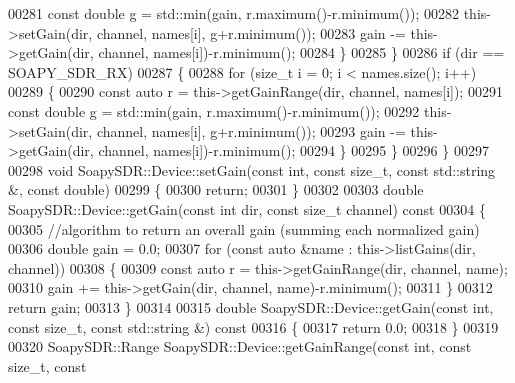 \begin{DoxyCode}
00281             \textcolor{keyword}{const} \textcolor{keywordtype}{double} g = std::min(gain, r.maximum()-r.minimum());
00282             this->setGain(dir, channel, names[i], g+r.minimum());
00283             gain -= this->getGain(dir, channel, names[i])-r.minimum();
00284         \}
00285     \}
00286     \textcolor{keywordflow}{if} (dir == SOAPY_SDR_RX)
00287     \{
00288         \textcolor{keywordflow}{for} (\textcolor{keywordtype}{size\_t} i = 0; i < names.size(); i++)
00289         \{
00290             \textcolor{keyword}{const} \textcolor{keyword}{auto} r = this->getGainRange(dir, channel, names[i]);
00291             \textcolor{keyword}{const} \textcolor{keywordtype}{double} g = std::min(gain, r.maximum()-r.minimum());
00292             this->setGain(dir, channel, names[i], g+r.minimum());
00293             gain -= this->getGain(dir, channel, names[i])-r.minimum();
00294         \}
00295     \}
00296 \}
00297 
00298 \textcolor{keywordtype}{void} SoapySDR::Device::setGain(\textcolor{keyword}{const} \textcolor{keywordtype}{int}, \textcolor{keyword}{const} \textcolor{keywordtype}{size\_t}, \textcolor{keyword}{const} std::string &, \textcolor{keyword}{const} \textcolor{keywordtype}{double})
00299 \{
00300     \textcolor{keywordflow}{return};
00301 \}
00302 
00303 \textcolor{keywordtype}{double} SoapySDR::Device::getGain(\textcolor{keyword}{const} \textcolor{keywordtype}{int} dir, \textcolor{keyword}{const} \textcolor{keywordtype}{size\_t} channel)\textcolor{keyword}{ const}
00304 \textcolor{keyword}{}\{
00305     \textcolor{comment}{//algorithm to return an overall gain (summing each normalized gain)}
00306     \textcolor{keywordtype}{double} gain = 0.0;
00307     \textcolor{keywordflow}{for} (\textcolor{keyword}{const} \textcolor{keyword}{auto} &name : this->listGains(dir, channel))
00308     \{
00309         \textcolor{keyword}{const} \textcolor{keyword}{auto} r = this->getGainRange(dir, channel, name);
00310         gain += this->getGain(dir, channel, name)-r.minimum();
00311     \}
00312     \textcolor{keywordflow}{return} gain;
00313 \}
00314 
00315 \textcolor{keywordtype}{double} SoapySDR::Device::getGain(\textcolor{keyword}{const} \textcolor{keywordtype}{int}, \textcolor{keyword}{const} \textcolor{keywordtype}{size\_t}, \textcolor{keyword}{const} std::string &)\textcolor{keyword}{ const}
00316 \textcolor{keyword}{}\{
00317     \textcolor{keywordflow}{return} 0.0;
00318 \}
00319 
00320 SoapySDR::Range SoapySDR::Device::getGainRange(\textcolor{keyword}{const} \textcolor{keywordtype}{int}, \textcolor{keyword}{const} \textcolor{keywordtype}{size\_t}, \textcolor{keyword}{const} 

\end{DoxyCode}
